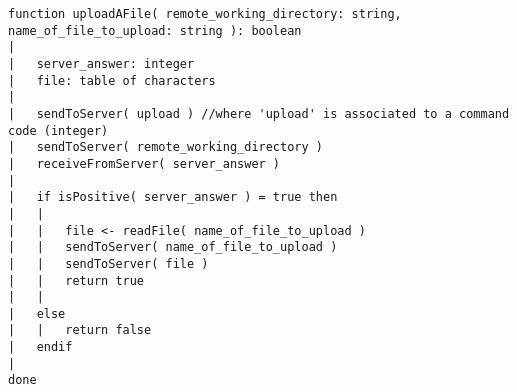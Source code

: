 \begin{lstlisting}[breaklines]
function uploadAFile( remote_working_directory: string, name_of_file_to_upload: string ): boolean
|
|	server_answer: integer
|	file: table of characters
|
|	sendToServer( upload ) //where 'upload' is associated to a command code (integer)
|	sendToServer( remote_working_directory )
|	receiveFromServer( server_answer )
|	
|	if isPositive( server_answer ) = true then
|	|	
|	|	file <- readFile( name_of_file_to_upload )
|	|	sendToServer( name_of_file_to_upload )
|	|	sendToServer( file )
|	|	return true
|	|
|	else
|	|	return false
|	endif
|	
done
\end{lstlisting}